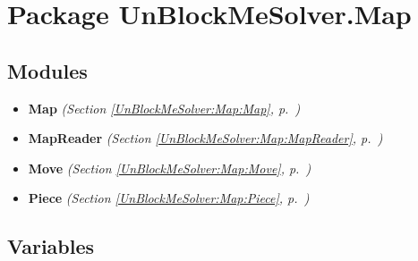 %
%
%


\section{Package UnBlockMeSolver.Map}

    \label{UnBlockMeSolver:Map}


\subsection{Modules}

\begin{itemize}
\setlength{\parskip}{0ex}
\item \textbf{Map}
  \textit{(Section \ref{UnBlockMeSolver:Map:Map}, p.~\pageref{UnBlockMeSolver:Map:Map})}

\item \textbf{MapReader}
  \textit{(Section \ref{UnBlockMeSolver:Map:MapReader}, p.~\pageref{UnBlockMeSolver:Map:MapReader})}

\item \textbf{Move}
  \textit{(Section \ref{UnBlockMeSolver:Map:Move}, p.~\pageref{UnBlockMeSolver:Map:Move})}

\item \textbf{Piece}
  \textit{(Section \ref{UnBlockMeSolver:Map:Piece}, p.~\pageref{UnBlockMeSolver:Map:Piece})}

\end{itemize}



  \subsection{Variables}

